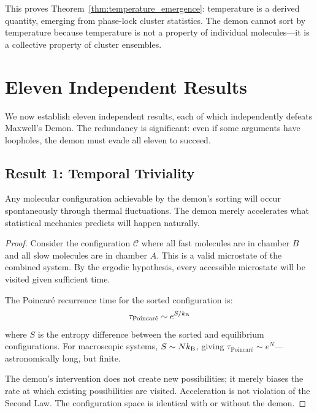 This proves Theorem~\ref{thm:temperature_emergence}: temperature is a derived quantity, emerging from phase-lock cluster statistics. The demon cannot sort by temperature because temperature is not a property of individual molecules---it is a collective property of cluster ensembles.

\section{Eleven Independent Results}
\label{sec:eleven_results}

We now establish eleven independent results, each of which independently defeats Maxwell's Demon. The redundancy is significant: even if some arguments have loopholes, the demon must evade all eleven to succeed.

\subsection{Result 1: Temporal Triviality}

\begin{theorem}
\label{thm:temporal_triviality}
Any molecular configuration achievable by the demon's sorting will occur spontaneously through thermal fluctuations. The demon merely accelerates what statistical mechanics predicts will happen naturally.
\end{theorem}

\begin{proof}
Consider the configuration $\mathcal{C}$ where all fast molecules are in chamber $B$ and all slow molecules are in chamber $A$. This is a valid microstate of the combined system. By the ergodic hypothesis, every accessible microstate will be visited given sufficient time.

The Poincaré recurrence time for the sorted configuration is:
\begin{equation}
\tau_{\text{Poincaré}} \sim e^{S/k_{\mathrm{B}}}
\label{eq:poincare}
\end{equation}
where $S$ is the entropy difference between the sorted and equilibrium configurations. For macroscopic systems, $S \sim Nk_{\mathrm{B}}$, giving $\tau_{\text{Poincaré}} \sim e^N$---astronomically long, but finite.

The demon's intervention does not create new possibilities; it merely biases the rate at which existing possibilities are visited. Acceleration is not violation of the Second Law. The configuration space is identical with or without the demon.
\end{proof}

